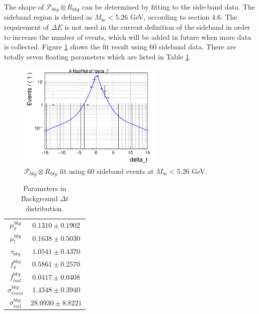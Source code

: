 The shape of $\mathcal{P}_{bkg}\otimes R_{bkg}$ can be determined by fitting to the side-band data. The sideband region is defined as $M_{bc}<5.26$ GeV, according to section 4.6. The requirement of $\Delta E$ is not used in the current definition of the sideband in order to increase the number of events, which will be added in future when more data is collected. Figure \ref{fig:Pbkg} shows the fit result using 60 sideband data. There are totally seven floating parameters which are listed in Table \ref{tab:Pbkg}.
\begin{figure}[htpb]
	\centering
	\includegraphics[height=5cm]{figures/bkg-cpfit-data-mbc526}
	\caption{$\mathcal{P}_{bkg}\otimes R_{bkg}$ fit  using 60 sideband events at $M_{bc} < 5.26$ GeV.}
	\label{fig:Pbkg}
\end{figure}
\begin{table}[htpb]
	\centering
	\begin{tabular}{|c|c|}
		\hline
		$\mu^{bkg}_{\delta}$ & $0.1310 \pm 0.1902$\\
		$\mu^{bkg}_{l}$&  $0.1638 \pm 0.5030$ \\
		$\tau_{bkg}$ & $1.0541\pm 0.4370$\\
		$f_{\delta}^{bkg}$ &  $0.5861\pm 0.2570$\\
		$f^{bkg}_{tail}$  & $0.0417\pm 0.0408$ \\
		$\sigma^{bkg}_{main}$ & $1.4348\pm 0.3940$\\
		$\sigma^{bkg}_{tail}$ & $28.0930 \pm 8.8221$\\
		\hline
	\end{tabular}
	\caption{Parameters in Background $\Delta t$ distribution. }
	\label{tab:Pbkg}
\end{table}



